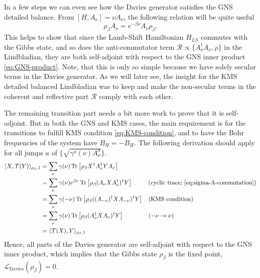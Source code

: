 In a few steps we can even see how the Davies generator satisfies the GNS detailed balance. From $[H, A_\nu] = \nu A_\nu$, the following relation will be quite useful
\begin{equation}
    \label{eq:sigma-A-commutation}
    \rho_\beta A_\nu = e^{-\beta \nu} A_\nu \rho_\beta.
\end{equation}
This helps to show that since the Lamb-Shift Hamiltonian $H_{LS}$ commutes with the Gibbs state, and so does the anti-commutator term $\mathcal{R} \propto \{A_\nu^\dagger A_\nu, \rho\}$ in the Lindbladian, they are both self-adjoint with respect to the GNS inner product \eqref{eq:GNS-product}. Note, that this is only so simple because we have solely secular terms in the Davies generator. As we will later see, the insight for the KMS detailed balanced Lindbladian was to keep and make the non-secular terms in the coherent and reflective part $\mathcal{R}$ comply with each other. 

The remaining transition part needs a bit more work to prove that it is self-adjoint. But in both the GNS and KMS cases, the main requirement is for the transitions to fulfill KMS condition \eqref{eq:KMS-condition}, and to have  
the Bohr frequencies of the system have $B_H = - B_H$. The following derivation should apply for all jumps $a$ of $\{\sqrt{\gamma^a(\nu)A_\nu^a}\}$.
\begin{equation}
    \label{eq:davies-gns-db}
    \begin{alignedat}{2}
        \langle X, \mathcal{T}(Y) \rangle_{\rho_\beta, 1} &= \sum_\nu \gamma(\nu) \operatorname{Tr}\left[\rho_\beta X^\dagger A_\nu^\dagger Y A_\nu\right] \\
        &= \sum_\nu \gamma(\nu) e^{\beta \nu} \operatorname{Tr}\left[\rho_\beta (A_\nu X A_\nu^\dagger)^\dagger Y\right]  &\quad& (\text{cyclic trace; \eqref{eq:sigma-A-commutation}})\\
        &= \sum_\nu \gamma(-\nu) \operatorname{Tr}\left[\rho_\beta ((A_{-\nu})^\dagger X A_{-\nu})^\dagger Y\right] &\quad& (\text{KMS condition})\\
        &= \sum_\nu \gamma(\nu) \operatorname{Tr}\left[\rho_\beta (A_{\nu}^\dagger X A_{\nu})^\dagger Y\right] &\quad& (-\nu \rightarrow \nu)\\
        &= \langle \mathcal{T}(X), Y \rangle_{\rho_\beta, 1}
    \end{alignedat}
\end{equation}
Hence, all parts of the Davies generator are self-adjoint with respect to the GNS inner product, which implies that the Gibbs state $\rho_\beta$ is the fixed point, $\mathcal{L}_\text{Davies}(\rho_\beta) = 0.$

